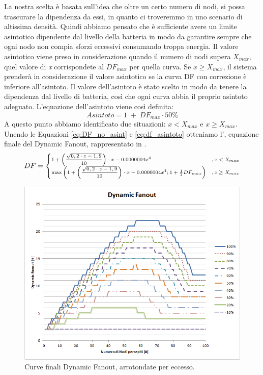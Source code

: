 La nostra scelta è basata sull'idea che oltre un certo numero di nodi, si possa trascurare la dipendenza da essi, in quanto ci troveremmo in uno scenario di altissima densità. Quindi abbiamo pensato che è sufficiente avere un limite asintotico dipendente dal livello della batteria in modo da garantire sempre che ogni nodo non compia sforzi eccessivi consumando troppa energia. Il valore asintotico viene preso in considerazione quando il numero di nodi supera $\mathit{X_{max}}$, quel valore di \textit{x} corrispondete al $\mathit{DF_{max}}$ per quella curva. Se $\textit{x}\geq\mathit{X_{max}}$, il sistema prenderà in considerazione il valore asintotico se la curva \acs{DF} con correzione è inferiore all'asintoto.
Il valore dell'asintoto è stato scelto in modo da tenere la dipendenza dal livello di batteria, così che ogni curva abbia il proprio asintoto adeguato. L'equazione dell'asintoto viene così definita:
\begin{equation}
	\label{eq:df_asintoto}
	Asintoto = 1\;+\;DF_{max}\cdot 50\%
\end{equation}
A questo punto abbiamo identificato due situazioni: $\textit{x}<\mathit{X_{max}}$ e $\textit{x}\geq \mathit{X_{max}}$. Unendo le Equazioni \ref{eq:DF_no_asint} e \ref{eq:df_asintoto} otteniamo l', equazione finale del Dynamic Fanout, rappresentato in .
\begin{equation}
\scriptsize
\label{eq:DF_totale}
DF = \begin{cases} 1 + \left( \dfrac{\sqrt{0,2\cdot z - 1,9}}{10} \right) \cdot x- 0.0000004x^4 & ,\textit{x}<\textit{X}_{max}\\
					\max \left( 1 + \left( \dfrac{\sqrt{0,2\cdot z - 1,9}}{10} \right) \cdot x- 0.0000004x^4 ; 1 + \frac{1}{2}DF_{max} \right) & ,\textit{x}\geq\textit{X}_{max}\end{cases}
\normalsize
\end{equation}
\begin{figure}[t]
	\centering
	\includegraphics[width=0.9\linewidth]{Images/grafici_usati/DF_tot_arr}
	\caption[DF finale (arrotondato)]{Curve finali Dynamic Fanout, arrotondate per eccesso.}
	\label{fig:DF_tot_arr}
\end{figure}
